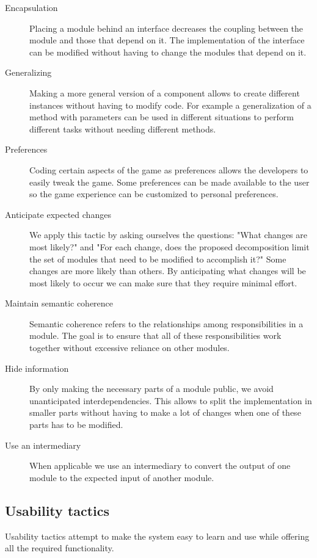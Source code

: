 	\begin{description}
		\item [Encapsulation]
			Placing a module behind an interface decreases the coupling between the module and those that depend on it. The implementation of the interface can be modified without having to change the modules that depend on it.
		\item [Generalizing]
			Making a more general version of a component allows to create different instances without having to modify code. For example a generalization of a method with parameters can be used in different situations to perform different tasks without needing different methods.
		\item [Preferences]
			Coding certain aspects of the game as preferences allows the developers to easily tweak the game. Some preferences can be made available to the user so the game experience can be customized to personal preferences.
		\item [Anticipate expected changes]
			We apply this tactic by asking ourselves the questions: "What changes are most likely?" and "For each change, does the proposed decomposition limit the set of modules that need to be modified to accomplish it?" Some changes are more likely than others. By anticipating what changes will be most likely to occur we can make sure that they require minimal effort.
		\item [Maintain semantic coherence]
			Semantic coherence refers to the relationships among responsibilities in a module. The goal is to ensure that all of these responsibilities work together without excessive reliance on other modules. 
		\item [Hide information]
			By only making the necessary parts of a module public, we avoid unanticipated interdependencies. This allows to split the implementation in smaller parts without having to make a lot of changes when one of these parts has to be modified.
		\item [Use an intermediary]
		When applicable we use an intermediary to convert the output of one module to the expected input of another module.
	\end{description}
	
		
	\subsection{Usability tactics}
	Usability tactics attempt to make the system easy to learn and use while offering all the required functionality. 
	
